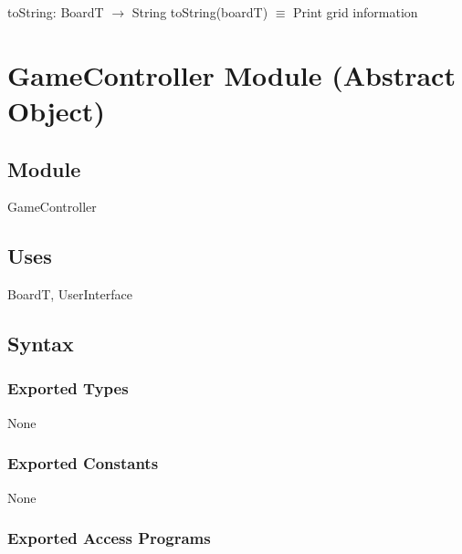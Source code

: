 \documentclass[12pt]{article}
\begin{document}
\noindent toString: BoardT $\rightarrow$ String
toString(boardT) $\equiv$ Print grid information

\newpage

\section* {GameController Module (Abstract Object)}

\subsection* {Module}

GameController

\subsection* {Uses}

BoardT, UserInterface

\subsection* {Syntax}

\subsubsection* {Exported Types}

None

\subsubsection* {Exported Constants}

None

\subsubsection* {Exported Access Programs}
\end{document}
